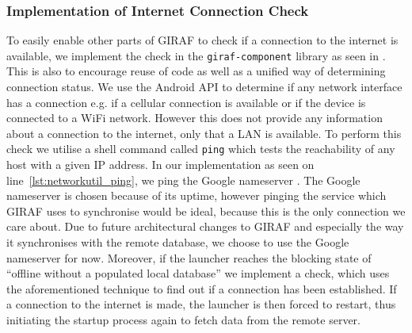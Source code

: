 \subsubsection{Implementation of Internet Connection Check}
To easily enable other parts of GIRAF to check if a connection to the internet is available, we implement the check in the \texttt{giraf-component} library as seen in . 
This is also to encourage reuse of code as well as a unified way of determining connection status.
We use the Android API to determine if any network interface has a connection e.g. if a cellular connection is available or if the device is connected to a WiFi network.
However this does not provide any information about a connection to the internet, only that a LAN is available.
To perform this check we utilise a shell command called \texttt{ping} which tests the reachability of any host with a given IP address.
In our implementation as seen on line~\ref{lst:networkutil_ping}, we ping the Google nameserver .
The Google nameserver is chosen because of its uptime, however pinging the service which GIRAF uses to synchronise would be ideal, because this is the only connection we care about.
Due to future architectural changes to GIRAF and especially the way it synchronises with the remote database, we choose to use the Google nameserver for now.
Moreover, if the launcher reaches the blocking state of \enquote{offline without a populated local database} we implement a check, which uses the aforementioned technique to find out if a connection has been established.
If a connection to the internet is made, the launcher is then forced to restart, thus initiating the startup process again to fetch data from the remote server.

